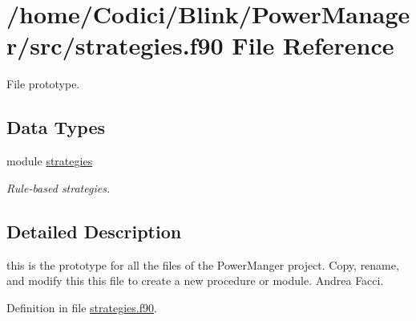 \hypertarget{strategies_8f90}{\section{/home/\-Codici/\-Blink/\-Power\-Manager/src/strategies.f90 File Reference}
\label{strategies_8f90}
}


File prototype.  


\subsection*{Data Types}
\begin{DoxyCompactItemize}
\item 
module \hyperlink{classstrategies}{strategies}
\begin{DoxyCompactList}\small\item\em Rule-\/based strategies. \end{DoxyCompactList}\end{DoxyCompactItemize}


\subsection{Detailed Description}
this is the prototype for all the files of the Power\-Manger project. Copy, rename, and modify this this file to create a new procedure or module.  Andrea Facci. 

Definition in file \hyperlink{strategies_8f90_source}{strategies.\-f90}.

